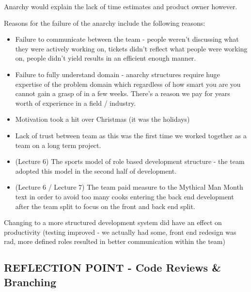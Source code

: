\documentclass{l3proj}
\begin{document}
Anarchy would explain the lack of time estimates and product owner however.

Reasons for the failure of the anarchy include the following reasons:

\begin{itemize}
\item Failure to communicate between the team - people weren’t discussing what they were actively working on, tickets didn’t reflect what people were working on, people didn’t yield results in an efficient enough manner.
\item Failure to fully understand domain - anarchy structures require huge expertise of the problem domain which regardless of how smart you are you cannot gain a grasp of in a few weeks. There’s a reason we pay for years worth of experience in a field / industry.
\item Motivation took a hit over Christmas (it was the holidays)
\item Lack of trust between team as this was the first time we worked together as a team on a long term project.
\item (Lecture 6) The sports model of role based development structure - the team adopted this model in the second half of development.
\item (Lecture 6 / Lecture 7) The team paid measure to the Mythical Man Month text in order to avoid too many cooks entering the back end development after the team split to focus on the front and back end split.
\end{itemize}

Changing to a more structured development system did have an effect on productivity (testing improved - we actually had some, front end redesign was rad, more defined roles resulted in better communication within the team)


\subsection{REFLECTION POINT - Code Reviews \& Branching}
\label{sec:codereviewbranch}

\end{document}
